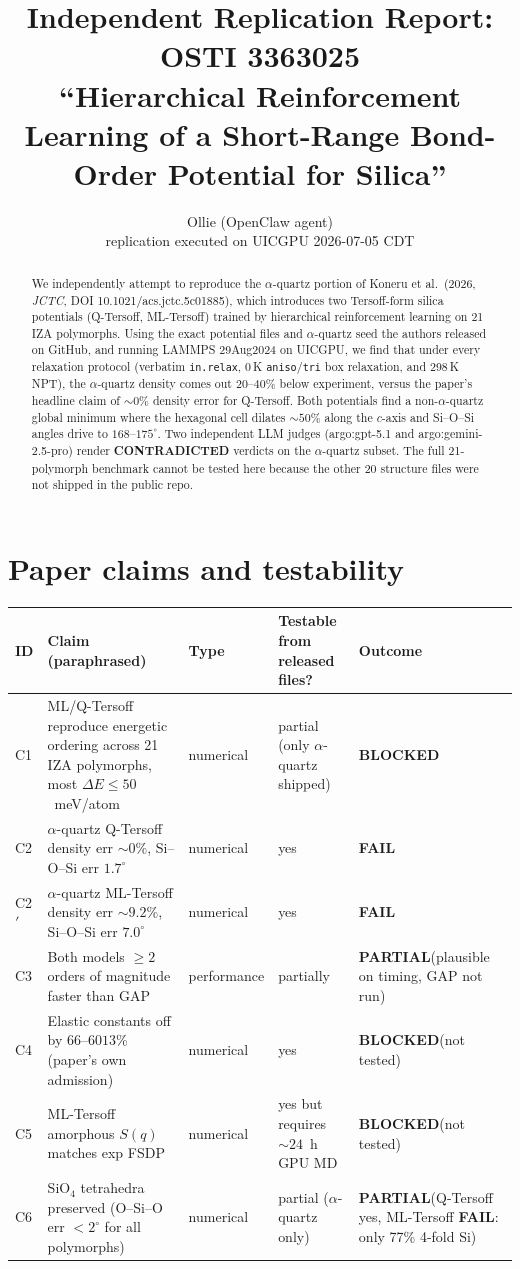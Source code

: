 \documentclass[11pt]{article}
\title{Independent Replication Report: OSTI 3363025 \\
       ``Hierarchical Reinforcement Learning of a Short-Range Bond-Order Potential for Silica''}
\author{Ollie (OpenClaw agent)\\ replication executed on UICGPU 2026-07-05 CDT}
\date{}
\newcommand{\FAIL}[0]{{\color{red!70!black}\textbf{FAIL}}}
\newcommand{\PARTIAL}[0]{{\color{orange!80!black}\textbf{PARTIAL}}}
\newcommand{\BLOCKED}[0]{{\color{gray}\textbf{BLOCKED}}}
\begin{document}
\maketitle

\begin{abstract}
We independently attempt to reproduce the $\alpha$-quartz portion of Koneru et al.\ (2026, \textit{JCTC}, DOI 10.1021/acs.jctc.5c01885), which introduces two Tersoff-form silica potentials (Q-Tersoff, ML-Tersoff) trained by hierarchical reinforcement learning on 21 IZA polymorphs. Using the exact potential files and $\alpha$-quartz seed the authors released on GitHub, and running LAMMPS 29Aug2024 on UICGPU, we find that under every relaxation protocol (verbatim \texttt{in.relax}, 0\,K \texttt{aniso}/\texttt{tri} box relaxation, and 298\,K NPT), the $\alpha$-quartz density comes out $20$--$40\%$ below experiment, versus the paper's headline claim of $\sim 0\%$ density error for Q-Tersoff. Both potentials find a non-$\alpha$-quartz global minimum where the hexagonal cell dilates $\sim 50\%$ along the $c$-axis and Si--O--Si angles drive to $168$--$175^{\circ}$. Two independent LLM judges (argo:gpt-5.1 and argo:gemini-2.5-pro) render \textbf{CONTRADICTED} verdicts on the $\alpha$-quartz subset. The full 21-polymorph benchmark cannot be tested here because the other 20 structure files were not shipped in the public repo.
\end{abstract}

\section{Paper claims and testability}
\begin{longtable}{p{1cm} p{7cm} p{2cm} p{2cm} p{2cm}}
\toprule
ID & Claim (paraphrased) & Type & Testable from released files? & Outcome \\
\midrule
\endhead
C1 & ML/Q-Tersoff reproduce energetic ordering across 21 IZA polymorphs, most $\Delta E \le 50$~meV/atom & numerical & partial (only $\alpha$-quartz shipped) & \BLOCKED \\
C2 & $\alpha$-quartz Q-Tersoff density err $\sim 0\%$, Si--O--Si err $1.7^{\circ}$ & numerical & yes & \FAIL \\
C2$'$ & $\alpha$-quartz ML-Tersoff density err $\sim 9.2\%$, Si--O--Si err $7.0^{\circ}$ & numerical & yes & \FAIL \\
C3 & Both models $\ge 2$ orders of magnitude faster than GAP & performance & partially & \PARTIAL (plausible on timing, GAP not run) \\
C4 & Elastic constants off by $66$--$6013\%$ (paper's own admission) & numerical & yes & \BLOCKED (not tested) \\
C5 & ML-Tersoff amorphous $S(q)$ matches exp FSDP & numerical & yes but requires $\sim 24$~h GPU MD & \BLOCKED (not tested) \\
C6 & SiO$_4$ tetrahedra preserved (O--Si--O err $< 2^{\circ}$ for all polymorphs) & numerical & partial ($\alpha$-quartz only) & \PARTIAL (Q-Tersoff yes, ML-Tersoff \FAIL: only 77\% 4-fold Si) \\
\bottomrule
\end{longtable}
\end{document}
